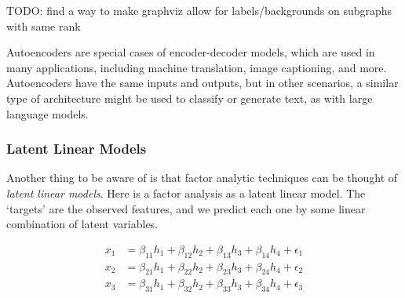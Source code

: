 \documentclass[
  letterpaper,
]{krantz}
\begin{document}
TODO: find a way to make graphviz allow for labels/backgrounds on
subgraphs with same rank

\begin{tcolorbox}[enhanced jigsaw, colback=white, toprule=.15mm, colframe=quarto-callout-note-color-frame, breakable, leftrule=.75mm, bottomrule=.15mm, opacityback=0, left=2mm, rightrule=.15mm, arc=.35mm]
\begin{minipage}[t]{5.5mm}
\textcolor{quarto-callout-note-color}{\faInfo}
\end{minipage}%
\begin{minipage}[t]{\textwidth - 5.5mm}

Autoencoders are special cases of encoder-decoder models, which are used
in many applications, including machine translation, image captioning,
and more. Autoencoders have the same inputs and outputs, but in other
scenarios, a similar type of architecture might be used to classify or
generate text, as with large language models.

\end{minipage}%
\end{tcolorbox}

\subsubsection{Latent Linear Models}\label{latent-linear-models}

Another thing to be aware of is that factor analytic techniques can be
thought of \emph{latent linear models}. Here is a factor analysis as a
latent linear model. The `targets' are the observed features, and we
predict each one by some linear combination of latent variables.

\[
\begin{aligned}
x_1 &= \beta_{11} h_1 + \beta_{12} h_2 + \beta_{13} h_3 + \beta_{14} h_4 + \epsilon_1 \\
x_2 &= \beta_{21} h_1 + \beta_{22} h_2 + \beta_{23} h_3 + \beta_{24} h_4 + \epsilon_2 \\
x_3 &= \beta_{31} h_1 + \beta_{32} h_2 + \beta_{33} h_3 + \beta_{34} h_4 + \epsilon_3 \\
\end{aligned}
\]
\end{document}
